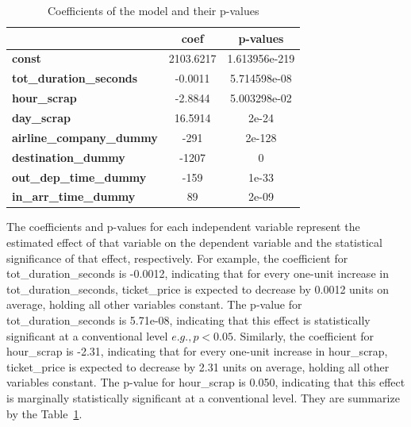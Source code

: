 \begin{table}[H]
  \centering
  \begin{tabular}{l c c}
  \hline
   & \textbf{coef} & \textbf{p-values} \\
  \hline
  \textbf{const} & 2103.6217 & 1.613956e-219 \\
  \textbf{tot\_duration\_seconds} & -0.0011 & 5.714598e-08 \\
  \textbf{hour\_scrap} & -2.8844 & 5.003298e-02 \\
  \textbf{day\_scrap} & 16.5914 & 2e-24\\
  \textbf{airline\_company\_dummy}&-291&2e-128\\
  \textbf{destination\_dummy}&-1207&0\\
  \textbf{out\_dep\_time\_dummy}&-159&1e-33\\
  \textbf{in\_arr\_time\_dummy}&89&2e-09\\
  \hline
  \end{tabular}
  \caption{Coefficients of the model and their p-values}
  \label{tab:my_tab1}
\end{table}

The coefficients and p-values for each independent variable represent the estimated effect of that variable on the dependent variable and the statistical significance of that effect, respectively.
For example, the coefficient for tot\_duration\_seconds is -0.0012, indicating that for every one-unit increase in tot\_duration\_seconds, ticket\_price is expected to decrease by 0.0012 units on average, holding all other variables constant.
The p-value for tot\_duration\_seconds is 5.71e-08, indicating that this effect is statistically significant at a conventional level \(e.g., p < 0.05\). 
Similarly, the coefficient for hour\_scrap is -2.31, indicating that for every one-unit increase in hour\_scrap,
ticket\_price is expected to decrease by 2.31 units on average, holding all other variables constant. 
The p-value for hour\_scrap is 0.050, indicating that this effect is marginally statistically significant at a conventional level.
They are summarize by the Table~\ref{tab:my_tab1}.

